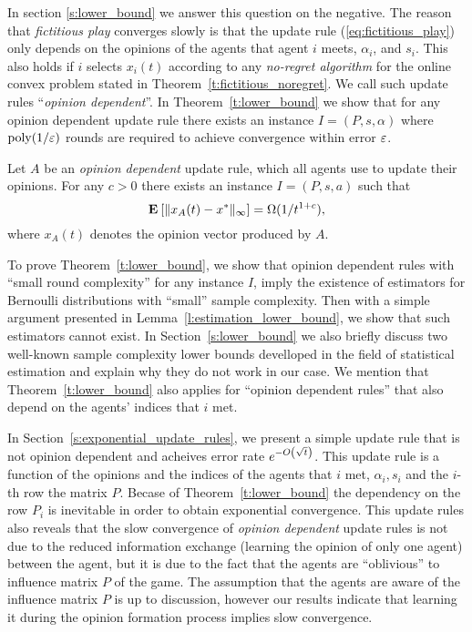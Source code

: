 In section \ref{s:lower_bound} we answer this question on the negative.
The reason that \emph{fictitious play} converges slowly is that the update rule (\ref{eq:fictitious_play})
only depends on the opinions of the agents that agent $i$ meets,
$\alpha_i$, and $s_i$. This also holds if $i$ selects $x_i(t)$ 
according to any \emph{no-regret algorithm} for the online convex 
problem stated in Theorem~\ref{t:fictitious_noregret}.
We call such update rules \enquote{\emph{opinion dependent}}.
In Theorem~\ref{t:lower_bound} we
show that for any opinion dependent update rule there exists an instance
$I = (P,s,\alpha)$ where $\mathrm{poly}(1/\varepsilon)$ rounds are required to
achieve convergence within error $\varepsilon$.
\begin{theorem}\label{t:lower_bound}
  Let $A$ be an \emph{opinion dependent} update rule, which all
  agents use to update their opinions.
  For any $c>0$ there exists an instance $I=(P,s,a)$ such that
  \[
    \Exp{\norm{\infty}{x_A(t) - x^*}} = \Omega(1/t^{1+c}),
  \]
where $x_A(t)$ denotes the opinion vector produced by $A$.
\end{theorem}
\noindent To prove Theorem~\ref{t:lower_bound}, we show that opinion dependent rules with
\enquote{small round complexity} for any instance $I$, imply the existence of estimators for Bernoulli distributions with 
\enquote{small} sample complexity. Then with a simple argument 
presented in Lemma~\ref{l:estimation_lower_bound},
we show that such estimators cannot exist.
In Section~\ref{s:lower_bound} we also
briefly discuss two well-known sample complexity lower bounds develloped in the field of
statistical estimation and explain why they do not work in our case. 
We mention that Theorem~\ref{t:lower_bound} also applies for \enquote{opinion dependent rules} that
also depend on the agents' indices that $i$ met.

In Section~\ref{s:exponential_update_rules}, we present 
a simple update rule that is not opinion dependent and  acheives 
error rate $e^{-O\left(\sqrt{t}\right)}$. This update rule is a function of
the opinions and the indices of the agents that $i$ met, $\alpha_i,s_i$ 
and the $i$-th row the matrix $P$. Becase of Theorem~\ref{t:lower_bound} 
the dependency on the row $P_i$ is inevitable in order to obtain exponential convergence.  
This update rules also reveals that the slow convergence of \emph{opinion dependent} update
rules is not due to the reduced information exchange (learning the opinion of only one agent)
between the agent, but it is due to the fact that the agents are \enquote{oblivious} to influence matrix $P$ of 
the game. The assumption that the agents are aware of the influence matrix $P$ is up to discussion,
however our results indicate that learning it during the opinion formation process
implies slow convergence.


